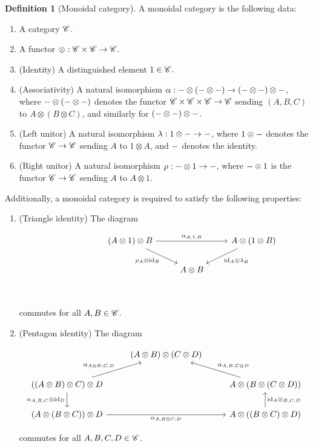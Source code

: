 \documentclass{article}
\theoremstyle{definition}
\newtheorem*{definition}{Definition}
\numberwithin{figure}{section}
\begin{document}
\begin{definition}[Monoidal category] A monoidal category is the following data:

\begin{enumerate}
\item A category $\mathscr{C}$.
\item A functor $\otimes: \mathscr{C} \times \mathscr{C} \to \mathscr{C}$.
\item (Identity) A distinguished element $1\in \mathscr{C}.$
\item (Associativity) A natural isomorphism $\alpha: \--\otimes (\-- \otimes \--) \to (\--\otimes \--)\otimes \--$, where $\-- \otimes (\--\otimes \--)$ denotes the functor $\mathscr{C}\times \mathscr{C}\times \mathscr{C}\to\mathscr{C}$ sending $(A,B,C)$ to $A\otimes (B\otimes C)$, and similarly for $(\-- \otimes \-- )\otimes\--$.
\item (Left unitor) A natural isomorphism $\lambda: 1\otimes \-- \to \--$, where $1\otimes \--$ denotes the functor $\mathscr{C}\to \mathscr{C}$ sending $A$ to $1\otimes A$, and $\--$ denotes the identity.
\item (Right unitor) A natural isomorphism $\rho: \--\otimes 1 \to \--$, where $\--\otimes 1$ is the functor $\mathscr{C}\to \mathscr{C}$ sending $A$ to $A\otimes 1$.
\end{enumerate}

Additionally, a monoidal category is required to satisfy the following properties:

\begin{enumerate}
\item (Triangle identity) The diagram

\[\begin{tikzcd}
	{} & {} & {\left(A\otimes 1\right)\otimes B} & {} & {A\otimes (1\otimes B)} \\
	&& {} & {A\otimes B} \\
	&&&& {}
	\arrow["{\alpha_{A,1,B}}", from=1-3, to=1-5]
	\arrow["{\rho_A\otimes \id_B}"', from=1-3, to=2-4]
	\arrow["{\id_A\otimes \lambda_B}", from=1-5, to=2-4]
\end{tikzcd}\]

commutes for all $A,B\in \mathscr{C}$.

\item (Pentagon identity) The diagram

\[\begin{tikzcd}
	& {(A\otimes B)\otimes(C\otimes D)} \\
	{((A\otimes B)\otimes C)\otimes D} && {A\otimes (B\otimes (C\otimes D))} \\
	{(A\otimes (B\otimes C))\otimes D} && {A\otimes((B\otimes C)\otimes D)}
	\arrow["{\alpha_{A\otimes B, C,D}}", from=2-1, to=1-2]
	\arrow["{\alpha_{A,B,{C\otimes D}}}"', from=2-3, to=1-2]
	\arrow["{\alpha_{A,B,C}\otimes \id_D}"', from=2-1, to=3-1]
	\arrow["{\id_A\otimes_{B,C,D}}"', from=3-3, to=2-3]
	\arrow["{\alpha_{A,B\otimes C,D}}"', from=3-1, to=3-3]
\end{tikzcd}\]

commutes for all $A,B,C,D\in \mathscr{C}$.
\end{enumerate}

\raggedleft\qedsymbol{}
\end{definition}
\end{document}
